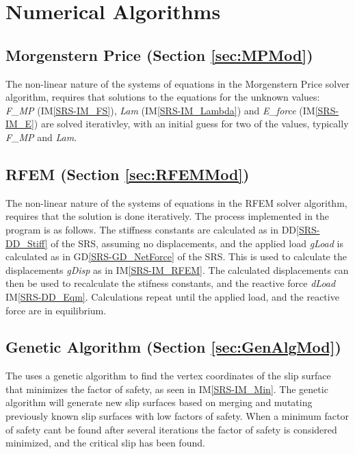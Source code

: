 \documentclass[12pt]{article}
\begin{document}

\section{Numerical Algorithms}

\subsection*{Morgenstern Price (Section \ref{sec:MPMod})}
The non-linear nature of the systems of equations in the Morgenstern
Price solver algorithm, requires that solutions to the equations for
the unknown values: \textit{F\_MP} (IM\ref{SRS-IM_FS}), \textit{Lam}
(IM\ref{SRS-IM_Lambda}) and \textit{E\_force} (IM\ref{SRS-IM_E}) are
solved iterativley, with an initial guess for two of the values,
typically \textit{F\_MP} and \textit{Lam}.

\subsection*{RFEM (Section \ref{sec:RFEMMod})}
The non-linear nature of the systems of equations in the RFEM solver
algorithm, requires that the solution is done iteratively. The
process implemented in the program is as follows. The stiffness
constants are calculated as in DD\ref{SRS-DD_Stiff} of the SRS,
assuming no displacements, and the applied load \textit{gLoad} is
calculated as in GD\ref{SRS-GD_NetForce} of the SRS. This is used to
calculate the displacements \textit{gDisp} as in
IM\ref{SRS-IM_RFEM}. The calculated displacements can then be used to
recalculate the stifness constants, and the reactive force
\textit{dLoad} IM\ref{SRS-DD_Eqm}. Calculations repeat until the
applied load, and the reactive force are in equilibrium.

\subsection*{Genetic Algorithm (Section \ref{sec:GenAlgMod})}
The uses a genetic algorithm to find the vertex coordinates of the
slip surface that minimizes the factor of safety, as seen in
IM\ref{SRS-IM_Min}. The genetic algorithm will generate new slip
surfaces based on merging and mutating previously known slip surfaces
with low factors of safety. When a minimum factor of safety cant be
found after several iterations the factor of safety is considered
minimized, and the critical slip has been found.
\end{document}
